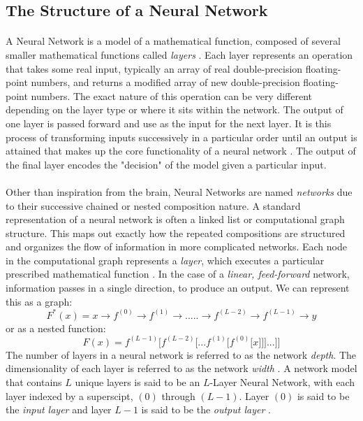 \documentclass[12pt,letterpaper]{article}
\begin{document}

\subsection{The Structure of a Neural Network}
\label{subsec-NetworkStructure}

\paragraph*{}A Neural Network is a model of a mathematical function, composed of several smaller mathematical functions called \textit{layers} \cite{Goodfellow,Loy}. Each layer represents an operation that takes some real input, typically an array of real double-precision floating-point numbers, and returns a modified array of new double-precision floating-point numbers. The exact nature of this operation can be very different depending on the layer type or where it sits within the network. The output of one layer is passed forward and use as the input for the next layer. It is this process of transforming inputs successively in a particular order until an output is attained that makes up the core functionality of a neural network \cite{Geron,Loy}. The output of the final layer encodes the "decision" of the model given a particular input.

\paragraph*{}Other than inspiration from the brain, Neural Networks are named \textit{networks} due to their successive chained or nested composition nature. A standard representation of a neural network is often a linked list or computational graph structure. This maps out exactly how the repeated compositions are structured and organizes the flow of information in more complicated networks. Each node in the computational graph represents a \textit{layer}, which executes a particular prescribed mathematical function \cite{Goodfellow}. In the case of a \textit{linear, feed-forward} network, information passes in a single direction, to produce an output. We can represent this as a graph:
\begin{equation}
\label{eqn-FunctionGraph}
F^*(x) = x \rightarrow f^{(0)} \rightarrow f^{(1)} \rightarrow ..... \rightarrow
f^{(L-2)} \rightarrow f^{(L-1)} \rightarrow y
\end{equation}
or as a nested function:
\begin{equation}
\label{eqn-FunctionChain}
F(x) = f^{(L-1)}\big[f^{(L-2)}\big[...f^{(1)}\big[f^{(0)}\big[x]\big]\big]...\big]\big]
\end{equation}
The number of layers in a neural network is referred to as the network \textit{depth}. The dimensionality of each layer is referred to as the network \textit{width} \cite{Geron,Loy}.
A network model that contains $L$ unique layers is said to be an $L$-Layer Neural Network, with each layer indexed by a superscipt, $(0)$ through $(L-1)$. Layer $(0)$ is said to be the \textit{input layer} and layer $L-1$ is said to be the \textit{output layer} \cite{Geron,Loy}. 
\end{document}
